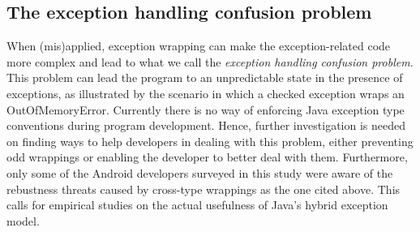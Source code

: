 
\subsection{The exception handling confusion problem}
When (mis)applied, exception wrapping can make the exception-related code
 more complex and lead to what we call the \emph{exception handling confusion problem}.
This problem can lead the program to an unpredictable state in the presence of exceptions,
as illustrated by the scenario in which a checked exception wraps an OutOfMemoryError. 
Currently there is no way of enforcing Java exception type conventions during program development.
Hence, further investigation is needed on finding ways to help developers in dealing with this
 problem, either preventing odd wrappings or enabling the developer to
 better deal with them.
Furthermore, only some of the Android developers surveyed in this study were aware of the 
rebustness threats caused by cross-type wrappings as the one cited above. This calls for empirical studies on the actual usefulness of Java's hybrid exception model. 


